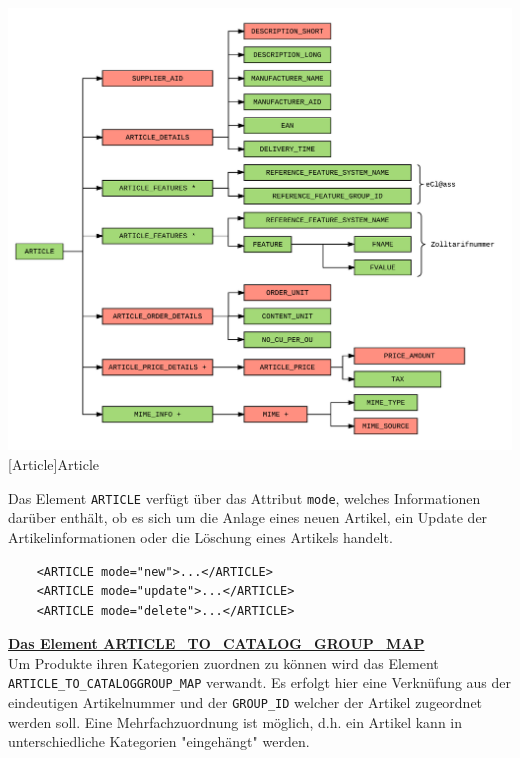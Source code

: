 	\begin{minipage}{\linewidth}
		\vspace{1em}
		\centering
		\includegraphics[width=1\linewidth]{img/Article}
		[Article]{Article}
		\label{fig:header}
		\vspace{1em}
	\end{minipage}
	
	Das Element \texttt{ARTICLE} verfügt über das Attribut \texttt{mode}, welches Informationen darüber enthält, ob es sich um die Anlage eines neuen Artikel, ein Update der Artikelinformationen oder die Löschung eines Artikels handelt.
	
	\begin{lstlisting}
	<ARTICLE mode="new">...</ARTICLE>
	<ARTICLE mode="update">...</ARTICLE>
	<ARTICLE mode="delete">...</ARTICLE>
	\end{lstlisting}
	
	
	
	\textbf{\underline{Das Element ARTICLE\_TO\_CATALOG\_GROUP\_MAP}}\\
	
	Um Produkte ihren Kategorien zuordnen zu können wird das Element \texttt{ARTICLE\_TO\_CATALOGGROUP\_MAP} verwandt. Es erfolgt hier eine Verknüfung aus der eindeutigen Artikelnummer und der \texttt{GROUP\_ID} welcher der Artikel zugeordnet werden soll. Eine Mehrfachzuordnung ist möglich, d.h. ein Artikel kann in unterschiedliche Kategorien "eingehängt" werden.
	
